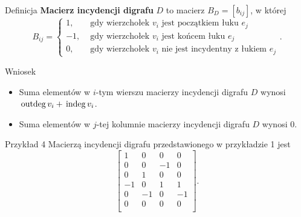 \documentclass[a4paper,10pt]{beamer}
\newcommand{\outdeg}{{\,\rm{outdeg}\,}}
\newcommand{\indeg}{{\,\rm{indeg}\,}}
\begin{document}
\begin{frame}
	
		\begin{block}{Definicja}
		{\bf Macierz incydencji digrafu} $D$ to macierz $B_D=[b_{ij}]$, w której
		$$B_{ij}=\left\{\begin{array}{ll}1,&\mbox{ gdy wierzchołek }v_i\mbox{ jest początkiem łuku }e_j\\-1,&\mbox{ gdy wierzchołek }v_i\mbox{ jest końcem łuku }e_j\\0,&\mbox{ gdy wierzchołek }v_i\mbox{ nie jest incydentny z łukiem }e_j\end{array}\right..$$
	\end{block}
	
	\begin{block}{Wniosek}
	\begin{itemize}
	\item Suma elementów w $i$-tym wierszu macierzy incydencji digrafu $D$ wynosi $\outdeg v_i+\indeg v_i$.
	\item Suma elementów w $j$-tej kolumnie macierzy incydencji digrafu $D$ wynosi $0$.
	\end{itemize}
	\end{block}

\end{frame}


\begin{frame}
\begin{exampleblock}{Przykład 4}
Macierzą incydencji digrafu przedstawionego w przykładzie 1 jest
$$\left[\begin{array}{cccc}
1&0&0&0\\
0&0&-1&0\\
0&1&0&0\\
-1&0&1&1\\
0&-1&0&-1\\
0&0&0&0\\
\end{array}\right].$$
\end{exampleblock}
\end{frame}
\end{document}
